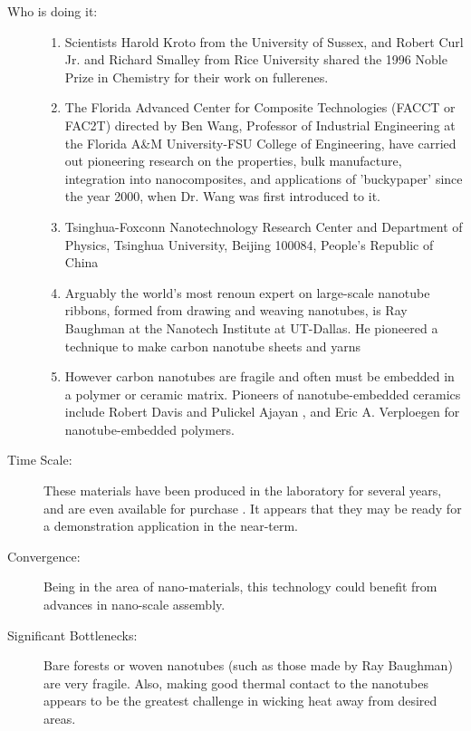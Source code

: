 \begin{description}
\item[Who is doing it:]
\hfill\begin{enumerate}
\item Scientists Harold Kroto from  the University of Sussex, and Robert Curl Jr. and Richard Smalley from  Rice University shared the 1996 Noble Prize in Chemistry for their work  on fullerenes.
\item The Florida Advanced Center  for Composite Technologies (FACCT or FAC2T) directed by Ben Wang,  Professor of Industrial Engineering at the Florida A\&M  University-FSU College of Engineering, have carried out pioneering  research on the properties, bulk manufacture, integration into  nanocomposites, and applications of
'buckypaper'  since the year 2000, when Dr. Wang was first introduced to it. \cite{solaracfaq}
\item Tsinghua-Foxconn  Nanotechnology Research Center and Department of Physics, Tsinghua  University, Beijing 100084, People's Republic of China  \cite{Wang2008}
\item Arguably the world's most  renoun expert on large-scale nanotube ribbons, formed from drawing and  weaving nanotubes, is Ray Baughman at the Nanotech Institute at  UT-Dallas. He pioneered a technique to make carbon nanotube sheets and  yarns \cite{nanotech}
\item However carbon nanotubes are  fragile and often must be embedded in a polymer or ceramic matrix.  Pioneers of nanotube-embedded ceramics include Robert Davis  \cite{Suhr2008} and  Pulickel Ajayan  \cite{Hutchison2010}, and Eric A. Verploegen for nanotube-embedded  polymers.
\end{enumerate}

\item[Time Scale:] These materials  have been produced in the laboratory for several years, and are even  available for purchase \cite{nanolab}. It appears that they may be ready for a  demonstration application in the near-term.
 
\item[Convergence:] Being in the  area of nano-materials, this technology could benefit from advances in  nano-scale assembly.
 
\item[Significant Bottlenecks:]  Bare forests or woven nanotubes (such as those made by Ray Baughman) are  very fragile. Also, making good thermal contact to the nanotubes  appears to be the greatest challenge in wicking heat away from desired  areas.
 \cite{buckypapernano}
 \end{description}

